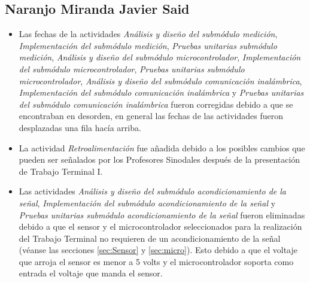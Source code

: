 \subsection{Naranjo Miranda Javier Said}
\begin{itemize}
	\item Las fechas de la actividades \textit{Análisis y diseño del submódulo medición}, \textit{Implementación del submódulo medición}, \textit{Pruebas unitarias submódulo medición}, \textit{Análisis y diseño del submódulo microcontrolador}, \textit{Implementación del submódulo microcontrolador}, \textit{Pruebas unitarias submódulo microcontrolador}, \textit{Análisis y diseño del submódulo comunicación inalámbrica}, \textit{Implementación del submódulo comunicación inalámbrica} y \textit{Pruebas unitarias del submódulo comunicación inalámbrica} fueron corregidas debido a que se encontraban en desorden, en general las fechas de las actividades fueron desplazadas una fila hacía arriba.
	\item La actividad \textit{Retroalimentación} fue añadida debido a los posibles cambios que pueden ser señalados por los Profesores Sinodales después de la presentación de Trabajo Terminal I.
	\item Las actividades \textit{Análisis y diseño del submódulo acondicionamiento de la señal}, \textit{Implementación del submódulo acondicionamiento de la señal} y \textit{Pruebas unitarias submódulo acondicionamiento de la señal} fueron eliminadas debido a que el sensor y el microcontrolador seleccionados para la realización del Trabajo Terminal no requieren de un acondicionamiento de la señal (véanse las secciones \ref{sec:Sensor} y \ref{sec:micro}). Esto debido a que el voltaje que arroja el sensor es menor a 5 volts y el microcontrolador soporta como entrada el voltaje que manda el sensor.
\end{itemize}